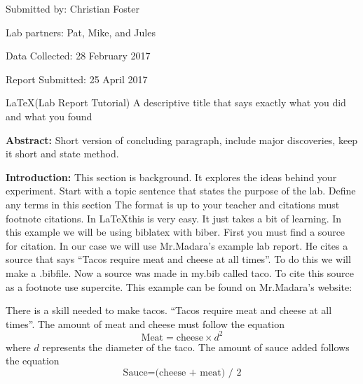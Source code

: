 \documentclass{report}
\begin{document}
 

\hfill Submitted by: Christian Foster 

\hfill Lab partners: Pat, Mike, and Jules 

\hfill Data Collected: 28 February 2017 

\hfill Report Submitted: 25 April 2017

\begin{center}
\fontsize{18pt}{12pt}\selectfont 
\LaTeX (Lab Report Tutorial) A descriptive title that says exactly what you did and what you found
\end{center}
\textbf{Abstract:} Short version of concluding paragraph, include major discoveries, keep it short and state method.
\begin{flushleft}
\textbf{Introduction:} This section is background. It explores the ideas behind your experiment. Start with a topic sentence that states the purpose of the lab. Define any terms in this section The format is up to your teacher and citations must footnote citations. In \LaTeX this is very easy. It just takes a bit of learning. In this example we will be using biblatex with biber. First you must find a source for citation. In our case we will use Mr.Madara's example lab report. He cites a source that says ``Tacos require meat and cheese at all times''. To do this we will make a .bibfile. Now a source was made in my.bib called taco. To cite this source as a footnote use supercite. This example can be found on Mr.Madara's website:\supercite{madara}
\end{flushleft}
\hspace{6ex}There is a skill needed to make tacos. ``Tacos require meat and cheese at all times''\supercite{taco}. 
The amount of meat and cheese must follow the equation\supercite{taco}
\begin{equation}\label{meateq}
\text{Meat} = \text{cheese} \times d^2
\end{equation}
where $d$ represents the diameter of the taco. The amount of sauce added  follows the equation\supercite{taco}
\begin{equation}\label{sauce}
\text{Sauce} = \text{(cheese + meat) / 2}
\end{equation}
\end{document}
